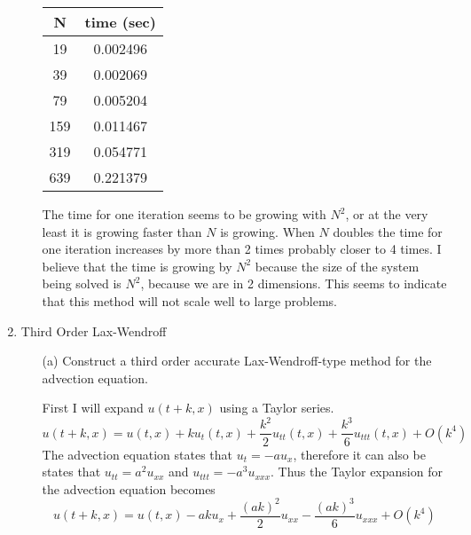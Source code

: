 \documentclass[11pt, oneside, titlepage]{article}
\begin{document}
\begin{enumerate}
\begin{enumerate}
                \begin{center}
                    \begin{tabular}{cc}
                        \toprule
                        N & time (sec) \\
                        \midrule
                        19 & 0.002496 \\
                        39 & 0.002069 \\
                        79 & 0.005204 \\
                        159 & 0.011467 \\
                        319 & 0.054771 \\
                        639 & 0.221379 \\
                        \bottomrule
                    \end{tabular}
                \end{center}
                The time for one iteration seems to be growing with $N^2$, or at
                the very least it is growing faster than $N$ is growing.
                When $N$ doubles the time for one iteration increases by more than
                2 times probably closer to 4 times.
                I believe that the time is growing by $N^2$ because the size of
                the system being solved is $N^2$, because we are in 2 dimensions.
                This seems to indicate that this method will not scale well to large
                problems.
        \end{enumerate}

    \item %
        Third Order Lax-Wendroff
        \begin{enumerate}
            \item[(a)]
                Construct a third order accurate Lax-Wendroff-type method for
                the advection equation.

                First I will expand $u(t + k, x)$ using a Taylor series.
                \[
                    u(t + k, x) = u(t, x) + k u_t(t, x) + \frac{k^2}{2}
                        u_{tt}(t, x) + \frac{k^3}{6} u_{ttt}(t, x) + O(k^4)
                \]
                The advection equation states that $u_t = -a u_x$, therefore it
                can also be states that $u_{tt} = a^2 u_{xx}$ and
                $u_{ttt} = -a^3 u_{xxx}$.
                Thus the Taylor expansion for the advection equation becomes
                \[
                    u(t+k,x) = u(t, x)  - ak u_x + \frac{(ak)^2}{2} u_{xx}
                        - \frac{(ak)^3}{6} u_{xxx} + O(k^4)
                \]


\end{enumerate}
\end{enumerate}
\end{document}

